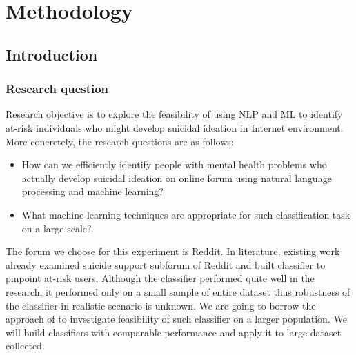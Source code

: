
\chapter{Methodology}
	\label{chapter:methodology}%





\section{Introduction}
\subsection{Research question}
Research objective is to explore the feasibility of using NLP and ML to identify at-risk individuals who might develop suicidal ideation in Internet environment. More concretely, the research questions are as follows:
\begin{itemize}
\item How can we efficiently identify people with mental health problems who actually develop suicidal ideation on online forum using natural language processing and machine learning?
\item What machine learning techniques are appropriate for such classification task on a large scale?
\end{itemize}
The forum we choose for this experiment is Reddit. In literature, existing work \cite{DeChoudhury2016} already examined suicide support subforum of Reddit and built classifier to pinpoint at-risk users. Although the classifier performed quite well in the research, it performed only on a small sample of entire dataset thus robustness of the classifier in realistic scenario is unknown. We are going to borrow the approach of \cite{DeChoudhury2016} to investigate feasibility of such classifier on a larger population. We will build classifiers with comparable performance and apply it to large dataset collected.
